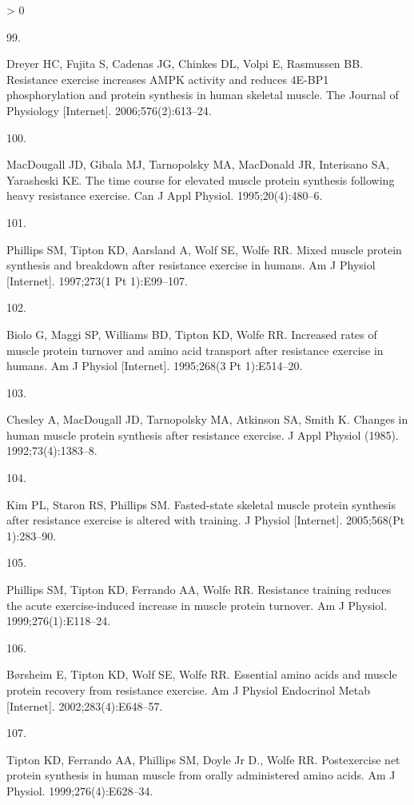 \documentclass[twoside,10pt]{gihclass} %
\newlength{\cslhangindent}
\newlength{\csllabelwidth}
\newenvironment{CSLReferences}[3] %
 {%
  \setlength{\parindent}{0pt}
  \ifodd #1 \everypar{\setlength{\hangindent}{\cslhangindent}}\ignorespaces\fi
  \ifnum #2 > 0
  \setlength{\parskip}{#2\baselineskip}
  \fi
 }%
 {}
\newcommand{\CSLLeftMargin}[1]{\parbox[t]{\maxof{\widthof{#1}}{\csllabelwidth}}{#1}}
\newcommand{\CSLRightInline}[1]{\parbox[t]{\linewidth}{#1}}
\begin{document}
\begin{CSLReferences}{0}{0}
\leavevmode\hypertarget{ref-RN2710}{}%
\CSLLeftMargin{99. }
\CSLRightInline{Dreyer HC, Fujita S, Cadenas JG, Chinkes DL, Volpi E, Rasmussen BB. Resistance exercise increases AMPK activity and reduces 4E-BP1 phosphorylation and protein synthesis in human skeletal muscle. The Journal of Physiology {[}Internet{]}. 2006;576(2):613--24. }

\leavevmode\hypertarget{ref-RN2711}{}%
\CSLLeftMargin{100. }
\CSLRightInline{MacDougall JD, Gibala MJ, Tarnopolsky MA, MacDonald JR, Interisano SA, Yarasheski KE. The time course for elevated muscle protein synthesis following heavy resistance exercise. Can J Appl Physiol. 1995;20(4):480--6. }

\leavevmode\hypertarget{ref-RN786}{}%
\CSLLeftMargin{101. }
\CSLRightInline{Phillips SM, Tipton KD, Aarsland A, Wolf SE, Wolfe RR. Mixed muscle protein synthesis and breakdown after resistance exercise in humans. Am J Physiol {[}Internet{]}. 1997;273(1 Pt 1):E99--107. }

\leavevmode\hypertarget{ref-RN2712}{}%
\CSLLeftMargin{102. }
\CSLRightInline{Biolo G, Maggi SP, Williams BD, Tipton KD, Wolfe RR. Increased rates of muscle protein turnover and amino acid transport after resistance exercise in humans. Am J Physiol {[}Internet{]}. 1995;268(3 Pt 1):E514--20. }

\leavevmode\hypertarget{ref-RN2717}{}%
\CSLLeftMargin{103. }
\CSLRightInline{Chesley A, MacDougall JD, Tarnopolsky MA, Atkinson SA, Smith K. Changes in human muscle protein synthesis after resistance exercise. J Appl Physiol (1985). 1992;73(4):1383--8. }

\leavevmode\hypertarget{ref-RN1521}{}%
\CSLLeftMargin{104. }
\CSLRightInline{Kim PL, Staron RS, Phillips SM. Fasted-state skeletal muscle protein synthesis after resistance exercise is altered with training. J Physiol {[}Internet{]}. 2005;568(Pt 1):283--90. }

\leavevmode\hypertarget{ref-RN2713}{}%
\CSLLeftMargin{105. }
\CSLRightInline{Phillips SM, Tipton KD, Ferrando AA, Wolfe RR. Resistance training reduces the acute exercise-induced increase in muscle protein turnover. Am J Physiol. 1999;276(1):E118--24. }

\leavevmode\hypertarget{ref-RN2714}{}%
\CSLLeftMargin{106. }
\CSLRightInline{Børsheim E, Tipton KD, Wolf SE, Wolfe RR. Essential amino acids and muscle protein recovery from resistance exercise. Am J Physiol Endocrinol Metab {[}Internet{]}. 2002;283(4):E648--57. }

\leavevmode\hypertarget{ref-RN2715}{}%
\CSLLeftMargin{107. }
\CSLRightInline{Tipton KD, Ferrando AA, Phillips SM, Doyle Jr D., Wolfe RR. Postexercise net protein synthesis in human muscle from orally administered amino acids. Am J Physiol. 1999;276(4):E628--34. }


\end{CSLReferences}
\end{document}
